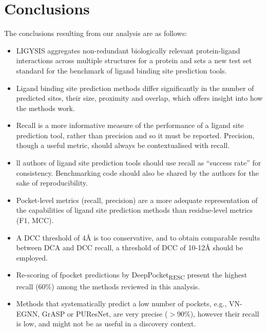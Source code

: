 \section{Conclusions}

The conclusions resulting from our analysis are as follows:

\begin{itemize}

\item LIGYSIS aggregates non-redundant biologically relevant protein-ligand interactions across multiple structures for a protein and sets a new test set standard for the benchmark of ligand binding site prediction tools. 

\item Ligand binding site prediction methods differ significantly in the number of predicted sites, their size, proximity and overlap, which offers insight into how the methods work.

\item Recall is a more informative measure of the performance of a ligand site prediction tool, rather than precision and so it must be reported. Precision, though a useful metric, should always be contextualised with recall.

\item ll authors of ligand site prediction tools should use recall as “success rate” for consistency. Benchmarking code should also be shared by the authors for the sake of reproducibility.

\item Pocket-level metrics (recall, precision) are a more adequate representation of the capabilities of ligand site prediction methods than residue-level metrics (F1, MCC).

\item A DCC threshold of 4\AA{} is too conservative, and to obtain comparable results between DCA and DCC recall, a threshold of DCC of 10-12\AA{} should be employed.

\item Re-scoring of fpocket predictions by DeepPocket\textsubscript{RESC} present the highest recall (60\%) among the methods reviewed in this analysis.

\item Methods that systematically predict a low number of pockets, e.g., VN-EGNN, GrASP or PUResNet, are very precise ($>$90\%), however their recall is low, and might not be as useful in a discovery context.

\end{itemize}
